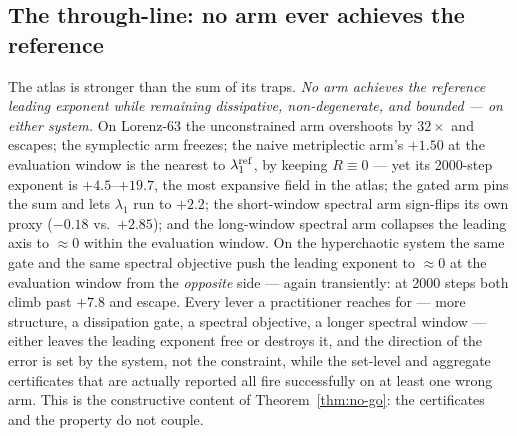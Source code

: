 \documentclass[11pt]{article}
\begin{document}
\subsection{The through-line: no arm ever achieves the reference}
The atlas is stronger than the sum of its traps. \emph{No arm achieves
the reference leading exponent while remaining dissipative,
non-degenerate, and bounded --- on either system.} On Lorenz-63 the
unconstrained arm overshoots by $32\times$ and escapes; the
symplectic arm freezes; the naive
metriplectic arm's $+1.50$ at the evaluation window is the nearest to
$\lambda_1^{\rm ref}$, by keeping $R\equiv0$ --- yet its 2000-step
exponent is $+4.5$--$+19.7$, the most expansive field in the atlas;
the gated arm pins the sum and lets $\lambda_1$ run to $+2.2$; the
short-window spectral arm sign-flips its own proxy ($-0.18$ vs.\
$+2.85$); and the long-window spectral arm collapses the leading axis
to $\approx0$ within the evaluation window. On the hyperchaotic
system the same gate and the same spectral objective push the leading
exponent to $\approx0$ at the evaluation window from the
\emph{opposite} side --- again transiently: at 2000 steps both climb
past $+7.8$ and escape. Every lever a practitioner reaches for ---
more structure, a dissipation gate, a spectral objective, a longer
spectral window --- either leaves the leading exponent free or
destroys it, and the direction of the error is set by the system, not
the constraint, while the set-level and aggregate certificates that
are actually reported all fire successfully on at least one wrong arm.
This is the constructive content of Theorem~\ref{thm:no-go}: the
certificates and the property do not couple.
\end{document}
